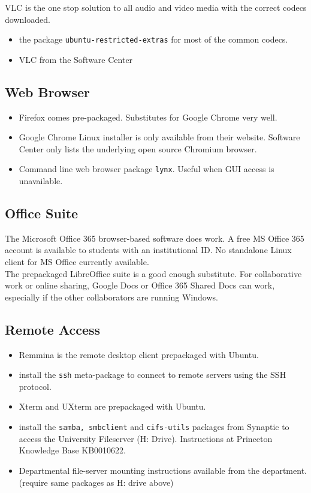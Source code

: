 \documentclass[8pt,letterpaper,twocolumn]{article}
\begin{document}
VLC is the one stop solution to all audio and video media with the correct codecs downloaded.

\begin{itemize}
	\item the package \texttt{ubuntu-restricted-extras} for most of the common codecs.
	\item VLC from the Software Center
\end{itemize}

\subsection{Web Browser}

\begin{itemize}
	\item Firefox comes pre-packaged. Substitutes for Google Chrome very well.
	\item Google Chrome Linux installer is only available from their website. Software Center only lists the underlying open source Chromium browser.
	\item Command line web browser package \texttt{lynx}. Useful when GUI access is unavailable.
	
\end{itemize}

\subsection{Office Suite}

The Microsoft Office 365 browser-based software does work. A free MS Office 365 account is available to students with an institutional ID. No standalone Linux client for MS Office currently available. \\

The prepackaged LibreOffice suite is a good enough substitute. For collaborative work or online sharing, Google Docs or Office 365 Shared Docs can work, especially if the other collaborators are running Windows.

\subsection{Remote Access}

\begin{itemize}
	\item Remmina is the remote desktop client prepackaged with Ubuntu.
	\item install the \texttt{ssh} meta-package to connect to remote servers using the SSH protocol.
	\item Xterm and UXterm are prepackaged with Ubuntu.
	\item install the \texttt{samba, smbclient} and \texttt{cifs-utils} packages from Synaptic to access the University Fileserver (H: Drive). Instructions at Princeton Knowledge Base KB0010622.
	\item Departmental file-server mounting instructions available from the department. (require same packages as H: drive above)
	 
\end{itemize}
\end{document}
